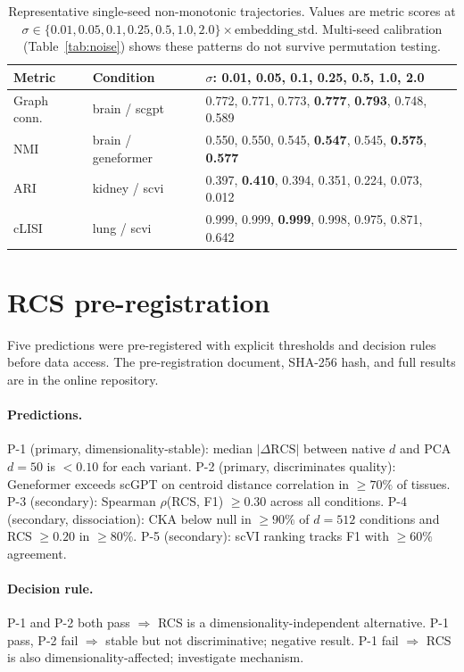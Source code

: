 \documentclass[11pt]{article}
\begin{document}
\begin{table}[h!]
\centering
\caption{Representative single-seed non-monotonic trajectories. Values
are metric scores at $\sigma \in \{0.01, 0.05, 0.1, 0.25, 0.5, 1.0,
2.0\} \times \text{embedding\_std}$. Multi-seed calibration
(Table~\ref{tab:noise}) shows these patterns do not survive permutation
testing.}
\label{tab:app_noise_fail}
\footnotesize
\begin{tabular}{@{}llp{}@{}}
\toprule
Metric & Condition & $\sigma$: 0.01, 0.05, 0.1, 0.25, 0.5, 1.0, 2.0 \\
\midrule
Graph conn. & brain / scgpt & 0.772, 0.771, 0.773, \textbf{0.777}, \textbf{0.793}, 0.748, 0.589 \\
NMI & brain / geneformer & 0.550, 0.550, 0.545, \textbf{0.547}, 0.545, \textbf{0.575}, \textbf{0.577} \\
ARI & kidney / scvi & 0.397, \textbf{0.410}, 0.394, 0.351, 0.224, 0.073, 0.012 \\
cLISI & lung / scvi & 0.999, 0.999, \textbf{0.999}, 0.998, 0.975, 0.871, 0.642 \\
\bottomrule
\end{tabular}
\end{table}


\section{RCS pre-registration}
\label{app:scgraph}

Five predictions were pre-registered with explicit thresholds and
decision rules before data access. The pre-registration document,
SHA-256 hash, and full results are in the online repository.

\paragraph{Predictions.} P-1 (primary, dimensionality-stable): median
$|\Delta\text{RCS}|$ between native $d$ and PCA $d = 50$ is $< 0.10$
for each variant. P-2 (primary, discriminates quality): Geneformer
exceeds scGPT on centroid distance correlation in $\geq 70\%$ of
tissues. P-3 (secondary): Spearman $\rho$(RCS, F1) $\geq 0.30$
across all conditions. P-4 (secondary, dissociation): CKA below null
in $\geq 90\%$ of $d = 512$ conditions and RCS $\geq 0.20$ in
$\geq 80\%$. P-5 (secondary): scVI ranking tracks F1 with $\geq 60\%$
agreement.

\paragraph{Decision rule.} P-1 and P-2 both pass $\Rightarrow$ RCS
is a dimensionality-independent alternative. P-1 pass, P-2 fail
$\Rightarrow$ stable but not discriminative; negative result. P-1 fail
$\Rightarrow$ RCS is also dimensionality-affected; investigate
mechanism.
\end{document}
